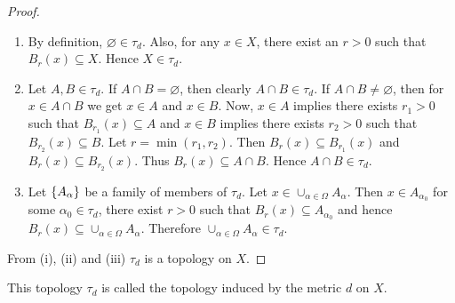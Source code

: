 \documentclass[../main-sheet.tex]{subfiles}
\begin{document}
\begin{proof}
    \begin{enumerate}[label=(\roman*)]
        \item By definition, \(\varnothing \in \tau_d\). Also, for any \(x\in X \), there exist an \(r>0\) such that \(B_r(x)\subseteq X    \). Hence \(X\in \tau_d\).
        \item Let \(A,B\in \tau_d\). If \(A\cap B=\varnothing\), then clearly \(A\cap B\in \tau_d\). If \(A\cap B\neq \varnothing\), then for \(x\in A\cap B\) we get \(x\in A\) and \(x\in B\). Now, \(x\in A\) implies there exists \(r_1>0\) such that \(B_{r_1}(x)\subseteq A\) and \(x\in B\) implies there exists \(r_2>0\) such that \(B_{r_2}(x)\subseteq B\). Let \(r=\min(r_1,r_2)\). Then \(B_r(x)\subseteq B_{r_1}(x)\) and \(B_r(x)\subseteq B_{r_2}(x)\). Thus \(B_r(x)\subseteq A\cap B\). Hence \(A\cap B\in\tau_d\).
        \item Let \(\left\{A_\alpha\right\}\) be a family of members of \(\tau_d\). Let \(x\in \cup_{\alpha\in\Omega}A_\alpha\). Then \(x\in A_{\alpha_0}\) for some \(\alpha_0\in \tau_d\), there exist \(r>0\) such that \(B_r(x)\subseteq A_{\alpha_0}\) and hence \(B_r(x)\subseteq \cup_{\alpha\in \Omega}A_\alpha\). Therefore \(\cup_{\alpha\in \Omega}A_\alpha\in \tau_d\).
    \end{enumerate}
    From (i), (ii) and (iii) \(\tau_d\) is a topology on \(X\).
\end{proof}
This topology \(\tau_d\) is called the topology induced by the metric \(d\) on \(X\).
\end{document}
